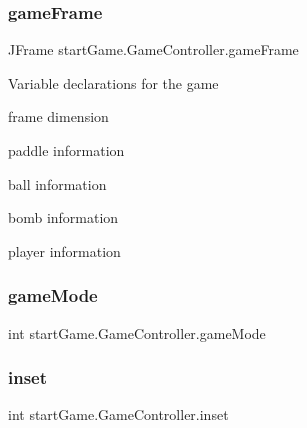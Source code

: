 \subsubsection{\texorpdfstring{game\+Frame}{gameFrame}}
{\footnotesize\ttfamily J\+Frame start\+Game.\+Game\+Controller.\+game\+Frame\hspace{0.3cm}{\ttfamily [private]}}

Variable declarations for the game
\begin{DoxyItemize}
\item frame dimension
\item paddle information
\item ball information
\item bomb information
\item player information 
\end{DoxyItemize}\hypertarget{classstart_game_1_1_game_controller_af029ba3e799fe940deb010e575287f55}{}\label{classstart_game_1_1_game_controller_af029ba3e799fe940deb010e575287f55} 
\subsubsection{\texorpdfstring{game\+Mode}{gameMode}}
{\footnotesize\ttfamily int start\+Game.\+Game\+Controller.\+game\+Mode\hspace{0.3cm}{\ttfamily [private]}}

\hypertarget{classstart_game_1_1_game_controller_a5195c030f589da53f78a185e31a5dc9a}{}\label{classstart_game_1_1_game_controller_a5195c030f589da53f78a185e31a5dc9a} 
\subsubsection{\texorpdfstring{inset}{inset}}
{\footnotesize\ttfamily int start\+Game.\+Game\+Controller.\+inset\hspace{0.3cm}{\ttfamily [private]}}

\hypertarget{classstart_game_1_1_game_controller_afed267a642ca7f3ec1c1074fec2996dd}{}\label{classstart_game_1_1_game_controller_afed267a642ca7f3ec1c1074fec2996dd} 
